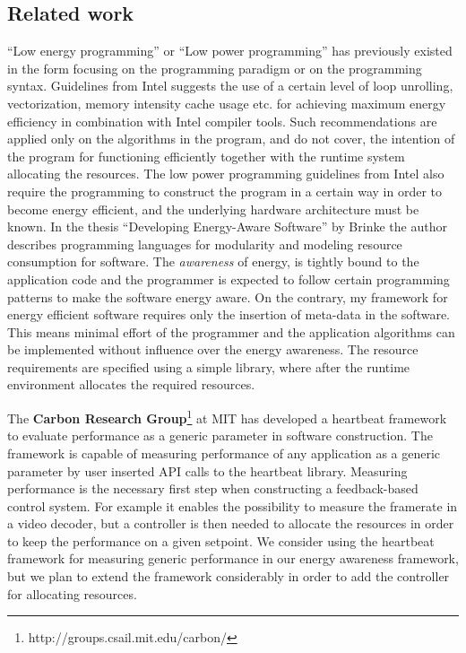 \documentclass{article}
\begin{document}
\subsection{Related work}
``Low energy programming'' or ``Low power programming'' has previously existed in the form focusing on the programming paradigm or on the programming syntax. 
Guidelines from Intel \cite{IntelLowPower} suggests the use of a certain level of loop unrolling, vectorization, memory intensity cache usage etc.
for achieving maximum energy efficiency in combination with Intel compiler tools. 
Such recommendations are applied only on the algorithms in the program, and do not cover, the intention of the program for functioning efficiently together with the runtime system allocating the resources. 
The low power programming guidelines from Intel also require the programming to construct the program in a certain way in order to become energy efficient, 
and the underlying hardware architecture must be known. 
In the thesis ``Developing Energy-Aware Software'' by Brinke \cite{Brinke:15} the author describes programming languages for modularity and modeling resource consumption for software.
The \textit{awareness} of energy, is tightly bound to the application code and the programmer is expected to follow certain programming patterns to make the software energy aware.
On the contrary, my framework for energy efficient software requires only the insertion of meta-data in the software.
This means minimal effort of the programmer and the application algorithms can be implemented without influence over the energy awareness.
The resource requirements are specified using a simple library, where after the runtime environment allocates the required resources.

The \textbf{Carbon Research Group}\footnote{http://groups.csail.mit.edu/carbon/} at MIT has developed a heartbeat framework to evaluate performance as a generic parameter in software construction. The framework is capable of measuring performance of any application as a generic parameter by user inserted API calls to the heartbeat library. Measuring performance is the necessary first step when constructing a feedback-based control system. For example it enables the possibility to measure the framerate in a video decoder, but a controller is then needed to allocate the resources in order to keep the performance on a given setpoint. We consider using the heartbeat framework for measuring generic performance in our energy awareness framework, but we plan to extend the framework considerably in order to add the controller for allocating resources.\\
\end{document}
